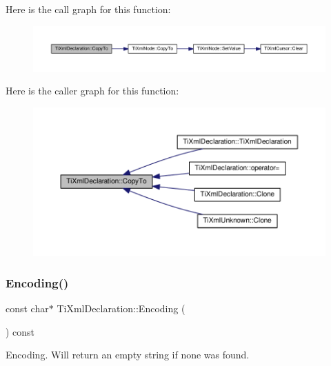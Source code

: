 Here is the call graph for this function\+:
\nopagebreak
\begin{figure}[H]
\begin{center}
\leavevmode
\includegraphics[width=350pt]{class_ti_xml_declaration_a189de17b3e04d4e5b1c385336f214af1_cgraph}
\end{center}
\end{figure}
Here is the caller graph for this function\+:
\nopagebreak
\begin{figure}[H]
\begin{center}
\leavevmode
\includegraphics[width=350pt]{class_ti_xml_declaration_a189de17b3e04d4e5b1c385336f214af1_icgraph}
\end{center}
\end{figure}
\mbox{\label{class_ti_xml_declaration_a8d3d1b5b226daa8353276d719497be80}} 
\subsubsection{\texorpdfstring{Encoding()}{Encoding()}}
{\footnotesize\ttfamily const char$\ast$ Ti\+Xml\+Declaration\+::\+Encoding (\begin{DoxyParamCaption}{ }\end{DoxyParamCaption}) const\hspace{0.3cm}{\ttfamily [inline]}}



Encoding. Will return an empty string if none was found. 

